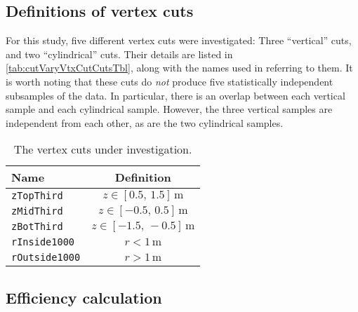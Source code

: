 \documentclass[../thesis.tex]{subfiles}
\begin{document}
\begin{comment}
(XXX note we haven't actually plotted the results of applying no efficiency correction. The scatter might be well above 1sigma in which case we need to reword the above.)
\end{comment}

\subsection{Definitions of vertex cuts}
\label{sec:cutVaryVtxCutDescOfCuts}

For this study, five different vertex cuts were investigated: Three ``vertical'' cuts, and two ``cylindrical'' cuts. Their details are listed in \autoref{tab:cutVaryVtxCutCutsTbl}, along with the names used in referring to them. It is worth noting that these cuts do \emph{not} produce five statistically independent subsamples of the data. In particular, there is an overlap between each vertical sample and each cylindrical sample. However, the three vertical samples are independent from each other, as are the two cylindrical samples.

\begin{table}[h]
  \begin{tabular}{lc}
    \toprule
    Name & Definition \\
    \midrule
    \texttt{zTopThird} & $z \in [0.5,\, 1.5]\,\mathrm{m}$ \\
    \texttt{zMidThird} & $z \in [-0.5,\, 0.5]\,\mathrm{m}$ \\
    \texttt{zBotThird} & $z \in [-1.5,\, -0.5]\,\mathrm{m}$ \\
    \texttt{rInside1000} & $r < 1\,\mathrm{m}$ \\
    \texttt{rOutside1000} & $r > 1\,\mathrm{m}$ \\
    \bottomrule
  \end{tabular}
  \caption{The vertex cuts under investigation.}
  \label{tab:cutVaryVtxCutCutsTbl}
\end{table}

\begin{comment}
  TODO Try doing vertex efficiency with background subtraction. Oh wait we already do.
\end{comment}

\subsection{Efficiency calculation}
\label{sec:cutVaryVtxCutEffCalc}
\end{document}
